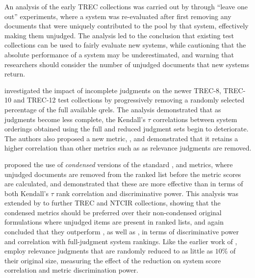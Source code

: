 An analysis of the early TREC collections was carried out
by {\citet{zobel98sigir}} through ``leave one out'' experiments,
where a system was re-evaluated after first removing any documents
that were uniquely contributed to the pool by that system,
effectively making them unjudged.
The analysis led to the conclusion that existing test collections can
be used to fairly evaluate new systems, while cautioning that the
absolute performance of a system may be underestimated, and warning
that researchers should consider the number of unjudged documents
that new systems return.

{\citet{bv04sigir}} investigated the impact of incomplete judgments on
the newer TREC-8, TREC-10 and TREC-12 test collections by progressively
removing a randomly selected percentage of the full available qrels.
The analysis demonstrated that as judgments become less complete, the
Kendall's $\tau$ correlations between system orderings obtained using
the full and reduced judgment sets begin to deteriorate.
The authors also proposed a new metric, {\bpref}, and demonstrated that
it retains a higher correlation than other metrics such as {\ap} as
relevance judgments are removed.

{\citet{sakai07sigir}} proposed the use of {\emph{condensed}}
versions of the standard {\qmeasure}, {\ap} and {\ndcg} metrics,
where unjudged documents are removed from the ranked list before the
metric scores are calculated, and demonstrated that these are more
effective than {\bpref} in terms of both Kendall's $\tau$ rank
correlation and discriminative power.
This analysis was extended by {\citet{sk08inforet}} to further TREC
and NTCIR collections, showing that the condensed metrics should be
preferred over their non-condensed original formulations where
unjudged items are present in ranked lists, and again concluded that
they outperform {\bpref}, as well as {\rbp}, in terms of
discriminative power and correlation with full-judgment system
rankings.
Like the earlier work of {\citet{bv04sigir}},
{\citeauthor{sk08inforet}} employ relevance judgments that are
randomly reduced to as little as $10$\% of their original size,
measuring the effect of the reduction on system score correlation and
metric discrimination power.


